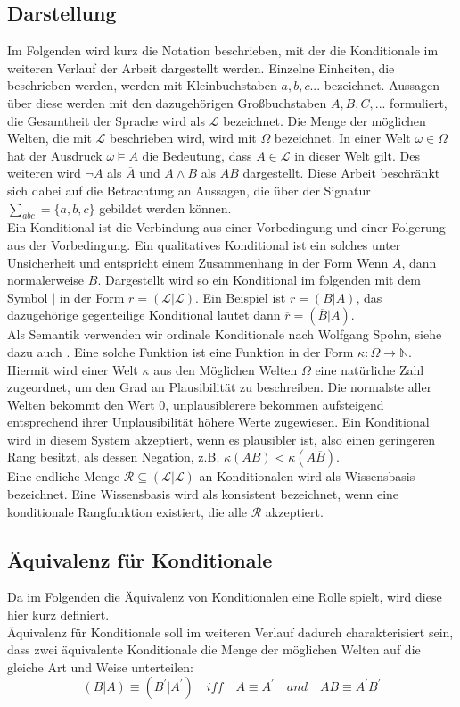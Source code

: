 \documentclass[12pt,a4paper]{article}
\newcommand{\lag}{\mathcal{L}}
\begin{document}
\subsection{Darstellung}
Im Folgenden wird kurz die Notation beschrieben, mit der die Konditionale im weiteren Verlauf der Arbeit dargestellt werden. Einzelne Einheiten, die beschrieben werden, werden mit Kleinbuchstaben $a, b, c ...$ bezeichnet. Aussagen über diese werden mit den dazugehörigen Großbuchstaben $A, B, C, ...$ formuliert, die Gesamtheit der Sprache wird als $\lag$ bezeichnet. Die Menge der möglichen Welten, die mit $\lag$ beschrieben wird, wird mit $\Omega$ bezeichnet. In einer Welt $\omega \in \Omega$  hat der Ausdruck $\omega \models A$ die Bedeutung, dass $A \in \lag$ in dieser Welt gilt. Des weiteren wird $\neg A$ als $\overline{A}$ und $A \wedge B$ als $AB$ dargestellt. Diese Arbeit beschränkt sich dabei auf die Betrachtung an Aussagen, die über der Signatur $\sum_{abc} = \{a, b, c\}$ gebildet werden können. \\
Ein Konditional ist die Verbindung aus einer Vorbedingung und einer Folgerung aus der Vorbedingung. Ein qualitatives Konditional ist ein solches unter  Unsicherheit und entspricht einem Zusammenhang in der Form \glqq Wenn $A$, dann normalerweise $B$\grqq . Dargestellt wird so ein Konditional  im folgenden mit dem Symbol $|$ in der Form $r = ( \lag | \lag)$. Ein Beispiel ist $r = (B|A)$, das dazugehörige gegenteilige Konditional lautet dann $\overline{r} = (\overline{B}|A)$.\\
Als Semantik verwenden wir ordinale Konditionale nach Wolfgang Spohn, siehe dazu auch \cite{spohn12}. Eine solche Funktion ist eine Funktion in der Form $\kappa :  \Omega \rightarrow \mathbb{N} $. Hiermit wird einer Welt $\kappa$ aus den Möglichen Welten $\Omega$ eine natürliche Zahl zugeordnet, um den Grad an Plausibilität zu beschreiben. Die normalste aller Welten bekommt den Wert 0, unplausiblerere bekommen aufsteigend entsprechend ihrer Unplausibilität höhere Werte zugewiesen. Ein Konditional wird in diesem System akzeptiert, wenn es plausibler ist, also einen geringeren Rang besitzt, als dessen Negation, z.B. $\kappa(AB)<\kappa(A\overline{B})$. \\
Eine endliche Menge $\mathcal{R} \subseteq (\lag | \lag)$ an Konditionalen wird als Wissensbasis bezeichnet. Eine Wissensbasis wird als konsistent bezeichnet, wenn eine konditionale Rangfunktion existiert, die alle $\mathcal{R}$ akzeptiert.

\subsection{Äquivalenz für Konditionale}
Da im Folgenden die Äquivalenz von Konditionalen eine Rolle spielt, wird diese hier kurz definiert.\\
Äquivalenz für Konditionale soll im weiteren Verlauf dadurch charakterisiert sein, dass zwei äquivalente Konditionale die Menge der möglichen Welten auf die gleiche Art und Weise unterteilen:
\begin{equation}
(B|A)\equiv (B^\prime|A^\prime) \quad iff \quad A\equiv A^\prime \quad and \quad AB \equiv A^\prime B^\prime
\end{equation}
\end{document}
